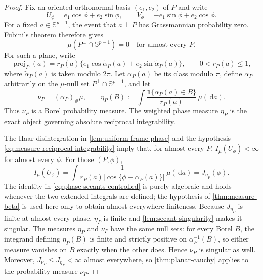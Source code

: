 \documentclass[11pt]{article}
\numberwithin{equation}{section}
\theoremstyle{thmstyleone}%
\theoremstyle{thmstyletwo}%
\let\cref\autoref
\newcommand{\sphere}{\mathbb S}
\newcommand{\dd}{\,\mathrm d}
\begin{document}
\begin{proof}
Fix an oriented orthonormal basis \((e_1,e_2)\) of \(P\) and write
\begin{equation}
  U_\phi=e_1\cos\phi+e_2\sin\phi,
  \qquad
  V_\phi=-e_1\sin\phi+e_2\cos\phi.
  \label{eq:measure-frame-phase}
\end{equation}
For a fixed \(a\in\sphere^{p-1}\), the event that \(a\perp P\) has
Grassmannian probability zero.  Fubini's theorem therefore gives
\begin{equation}
  \mu(P^\perp\cap\sphere^{p-1})=0
  \quad\text{for almost every }P.
  \label{eq:measure-no-orthogonal-mass}
\end{equation}
For such a plane, write
\begin{equation}
  \operatorname{proj}_P(a)
  =r_P(a)
   \{e_1\cos\widetilde\alpha_P(a)
      +e_2\sin\widetilde\alpha_P(a)\},
  \qquad 0<r_P(a)\leq1,
  \label{eq:measure-phase-map}
\end{equation}
where \(\widetilde\alpha_P(a)\) is taken modulo \(2\pi\).  Let
\(\alpha_P(a)\) be its class modulo \(\pi\), define \(\alpha_P\)
arbitrarily on the \(\mu\)-null set
\(P^\perp\cap\sphere^{p-1}\), and let
  \begin{equation}
  \nu_P=(\alpha_P)_\#\mu,
  \qquad
  \eta_P(B)
  :=
  \int
  \frac{\boldsymbol 1\{\alpha_P(a)\in B\}}{r_P(a)}
  \,\mu(\dd a).
  \label{eq:weighted-phase-measure}
  \end{equation}
Thus \(\nu_P\) is a Borel probability measure.  The weighted phase measure
\(\eta_P\) is the exact object governing absolute reciprocal
integrability.

The Haar disintegration in \cref{lem:uniform-frame-phase} and the hypothesis
\cref{eq:measure-reciprocal-integrability} imply that, for almost every
\(P\), \(I_\mu(U_\phi)<\infty\) for almost every \(\phi\).  For those
\((P,\phi)\),
\begin{equation}
  I_\mu(U_\phi)
  =
  \int
  \frac{1}{r_P(a)|\cos\{\phi-\alpha_P(a)\}|}
  \,\mu(\dd a)
  =
  J_{\eta_P}(\phi).
  \label{eq:phase-secants-controlled}
\end{equation}
The identity in \cref{eq:phase-secants-controlled} is purely algebraic and
holds whenever the two extended integrals are defined; the hypothesis of
\cref{thm:measure-beta} is used here only to obtain almost-everywhere
finiteness.
Because \(J_{\eta_P}\) is finite at almost every phase, \(\eta_P\) is
finite and \cref{lem:secant-singularity} makes it singular.  The measures
\(\eta_P\) and \(\nu_P\) have the same null sets: for every Borel \(B\),
the integrand defining \(\eta_P(B)\) is finite and strictly positive on
\(\alpha_P^{-1}(B)\), so either measure vanishes on \(B\) exactly when the
other does.  Hence \(\nu_P\) is singular as well.  Moreover,
\(J_{\nu_P}\leq J_{\eta_P}<\infty\) almost everywhere, so
\cref{thm:planar-cauchy} applies to the probability measure \(\nu_P\).


\end{proof}
\end{document}
